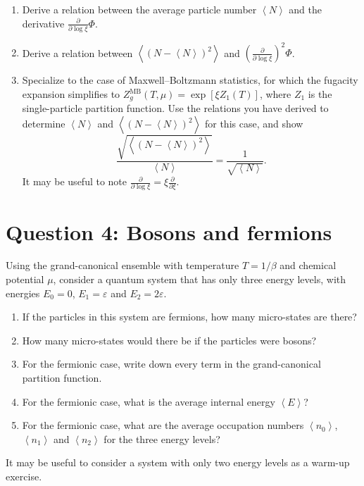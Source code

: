 \documentclass[12 pt]{article} %
\newcommand{\be}{\ensuremath{\beta} }
\newcommand{\eps}{\ensuremath{\varepsilon} }
\newcommand{\vev}[1]{\ensuremath{\left\langle #1 \right\rangle} }
\newcommand{\pderiv}[2]{\ensuremath{\frac{\partial #1}{\partial #2}} }
\newcommand{\showmarks}[1]{\rightline{\texttt{[#1 marks]}}} %
\begin{document}
\begin{enumerate}[label={(\alph*)}]
  \item Derive a relation between the average particle number $\vev{N}$ and the derivative $\displaystyle \pderiv{}{\log \xi}\Phi$.

  \showmarks{8}

  \item Derive a relation between $\vev{\left(N - \vev{N}\right)^2}$ and $\displaystyle \left(\pderiv{}{\log \xi}\right)^2 \Phi$.

  \showmarks{8}

  \item Specialize to the case of Maxwell--Boltzmann statistics, for which the fugacity expansion simplifies to $Z_g^{\text{MB}}(T, \mu) = \exp[\xi Z_1(T)]$, where $Z_1$ is the single-particle partition function.
        Use the relations you have derived to determine $\vev{N}$ and $\vev{\left(N - \vev{N}\right)^2}$ for this case, and show
        \begin{equation*}
          \frac{\sqrt{\vev{\left(N - \vev{N}\right)^2}}}{\vev{N}} = \frac{1}{\sqrt{\vev{N}}}.
        \end{equation*}
        It may be useful to note $\displaystyle \pderiv{}{\log \xi} = \xi \pderiv{}{\xi}$.

  \showmarks{8}
\end{enumerate}



\vfill
\section*{Question 4: Bosons and fermions}
Using the grand-canonical ensemble with temperature $T = 1 / \be$ and chemical potential $\mu$, consider a quantum system that has only three energy levels, with energies $E_0 = 0$, $E_1 = \eps$ and $E_2 = 2\eps$.
\begin{enumerate}[label={(\alph*)}]
  \item If the particles in this system are fermions, how many micro-states are there?

  \showmarks{2}

  \item How many micro-states would there be if the particles were bosons?

  \showmarks{2}

  \item For the fermionic case, write down every term in the grand-canonical partition function.

  \showmarks{6}

  \item For the fermionic case, what is the average internal energy $\vev{E}$?

  \showmarks{8}

  \item For the fermionic case, what are the average occupation numbers $\vev{n_0}$, $\vev{n_1}$ and $\vev{n_2}$ for the three energy levels?

  \showmarks{8}
\end{enumerate}

\noindent It may be useful to consider a system with only two energy levels as a warm-up exercise.



\end{document}
